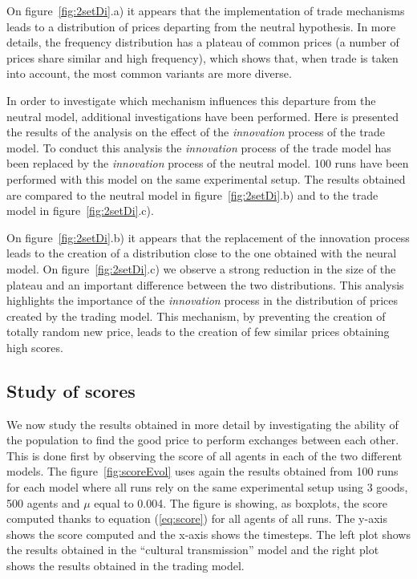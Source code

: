 \documentclass{wscpaperproc}
\begin{document}
On figure~\ref{fig:2setDi}.a) it appears that the implementation of trade mechanisms leads to a distribution of prices departing from the neutral hypothesis. In more details, the frequency distribution has a plateau of common prices (a number of prices share similar and high frequency), which shows that, when trade is taken into account, the most common variants are more diverse. 

In order to investigate which mechanism influences this departure from the neutral model, additional investigations have been performed. Here is presented the results of the analysis on the effect of the \emph{innovation} process of the trade model. To conduct this analysis the \emph{innovation} process of the trade model has been replaced by the \emph{innovation} process of the neutral model. 100 runs have been performed with this model on the same experimental setup. The results obtained are compared to the neutral model in figure~\ref{fig:2setDi}.b) and to the trade model in figure~\ref{fig:2setDi}.c). 

On figure~\ref{fig:2setDi}.b) it appears that the replacement of the innovation process leads to the creation of a distribution close to the one obtained with the neural model. On figure~\ref{fig:2setDi}.c) we observe a strong reduction in the size of the plateau and an important difference between the two distributions. This analysis highlights the importance of the \emph{innovation} process in the distribution of prices created by the trading model. This mechanism, by preventing the creation of totally random new price, leads to the creation of few similar prices obtaining high scores.


\subsection{Study of scores}

We now study the results obtained in more detail by investigating the ability of the population to find the good price to perform exchanges between each other. This is done first by observing the score of all agents in each of the two different models. The figure~\ref{fig:scoreEvol} uses again the results obtained from 100 runs for each model where all runs rely on the same experimental setup using 3 goods, 500 agents and $\mu$ equal to 0.004. The figure is showing, as boxplots, the score computed thanks to equation (\ref{eq:score}) for all agents of all runs. The y-axis shows the score computed and the x-axis shows the timesteps. The left plot shows the results obtained in the ``cultural transmission'' model and the right plot shows the results obtained in the trading model.
\end{document}
